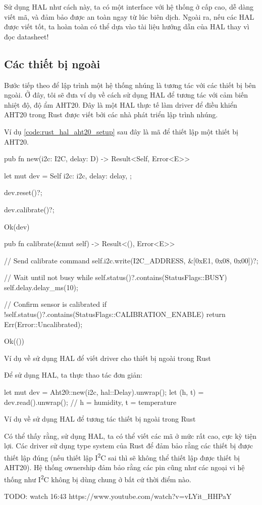 Sử dụng HAL như cách này, ta có một interface với hệ thống ở cấp cao, dễ dàng viết mã, và đảm bảo được an toàn ngay từ lúc biên dịch.
Ngoài ra, nếu các HAL được viết tốt, ta hoàn toàn có thể dựa vào tài liệu hướng dẫn của HAL thay vì đọc datasheet!

\subsection{Các thiết bị ngoài}
Bước tiếp theo để lập trình một hệ thống nhúng là tương tác với các thiết bị bên ngoài.
Ở đây, tôi sẽ đưa ví dụ về cách sử dụng HAL để tương tác với cảm biến nhiệt độ, độ ẩm AHT20.
Đây là một HAL thực tế làm driver để điều khiển AHT20 trong Rust được viết bởi các nhà phát triển lập trình nhúng. \cite{hal_aht20}

\pagebreak
Ví dụ \ref{code:rust_hal_aht20_setup} sau đây là mã để thiết lập một thiết bị AHT20.

\begin{listing}[ht]
\begin{rustcode}
pub fn new(i2c: I2C, delay: D) -> Result<Self, Error<E>> {
    let mut dev = Self {
        i2c: i2c,
        delay: delay,
    };

    dev.reset()?;

    dev.calibrate()?;

    Ok(dev)
}
pub fn calibrate(&mut self) -> Result<(), Error<E>> {
    // Send calibrate command
    self.i2c.write(I2C_ADDRESS, &[0xE1, 0x08, 0x00])?;

    // Wait until not busy
    while self.status()?.contains(StatusFlags::BUSY) {
        self.delay.delay_ms(10);
    }

    // Confirm sensor is calibrated
    if !self.status()?.contains(StatusFlags::CALIBRATION_ENABLE) {
        return Err(Error::Uncalibrated);
    }

    Ok(())
}
\end{rustcode}
\caption{Ví dụ về sử dụng HAL để viết driver cho thiết bị ngoài trong Rust}
\label{code:rust_hal_aht20_setup}
\end{listing}

Để sử dụng HAL, ta thực thao tác đơn giản:

\begin{listing}[ht]
\begin{rustcode}
let mut dev = Aht20::new(i2c, hal::Delay).unwrap();
let (h, t) = dev.read().unwrap(); // h = humidity, t = temperature
\end{rustcode}
\caption{Ví dụ về sử dụng HAL để tương tác thiết bị ngoài trong Rust}
\end{listing}

Có thể thấy rằng, sử dụng HAL, ta có thể viết các mã ở mức rất cao, cực kỳ tiện lợi.
Các driver sử dụng type system của Rust để đảm bảo rằng các thiết bị được thiết lập đúng
(nếu thiết lập I\textsuperscript{2}C sai thì sẽ không thể thiết lập được thiết bị AHT20).
Hệ thống ownership đảm bảo rằng các pin cũng như các ngoại vi hệ thống như I\textsuperscript{2}C không bị dùng chung ở bất cứ thời điểm nào.

TODO: watch 16:43 https://www.youtube.com/watch?v=vLYit_HHPaY
